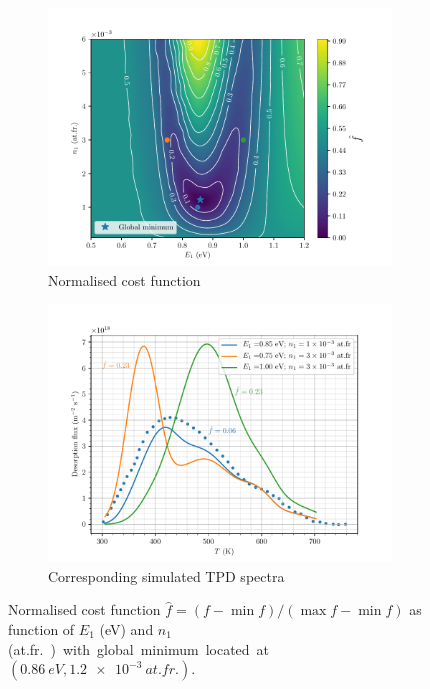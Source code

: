 \begin{figure} [ht]
    \centering
        \begin{subfigure}[t]{0.5\linewidth}
            \centering
            \includegraphics[width=\linewidth]{Figures/Chapter3/Parametric_optimisation/cost_function_2D.pdf}
            \caption{Normalised cost function}
            \label{fig:2D}
        \end{subfigure}%
        \begin{subfigure}[t]{0.5\linewidth}
            \centering
            \includegraphics[width=\linewidth]{Figures/Chapter3/Parametric_optimisation/points_on_cost_function.pdf}
            \caption{Corresponding simulated TPD spectra}
            \label{fig:corresponding spectra}
        \end{subfigure}%
    \caption{Normalised cost function $\hat{f} = (f - \min{f})/(\max{f}-\min{f})$ as function of $E_1$ (\si{eV}) and $n_1$ (\si{at.fr.}) with global minimum located at $(\SI{0.86}{eV}, \SI{1.2e-3}{at.fr.})$.}
    \label{fig:cost function}
\end{figure}

